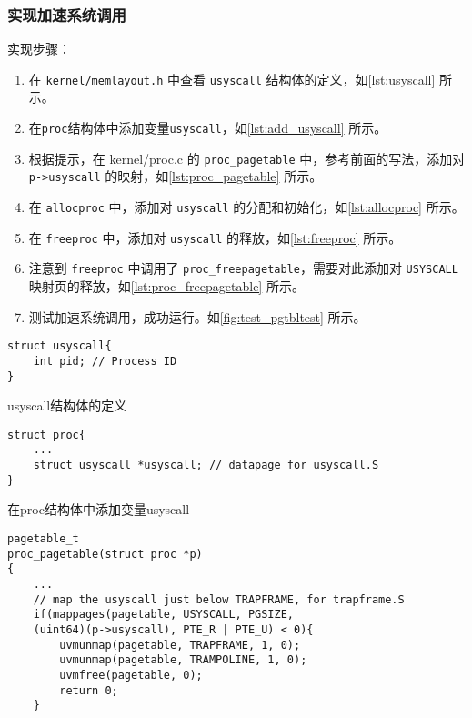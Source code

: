 {\subsubsection{实现加速系统调用}

实现步骤：
\begin{enumerate}
	\item 在 \texttt{kernel/memlayout.h} 中查看 \texttt{usyscall} 结构体的定义，如\cref{lst:usyscall} 所示。
	\item 在\texttt{proc}结构体中添加变量\texttt{usyscall}，如\cref{lst:add_usyscall} 所示。
	\item 根据提示，在 kernel/proc.c 的 \texttt{proc\_pagetable} 中，参考前面的写法，添加对\texttt{p->usyscall} 的映射，如\cref{lst:proc_pagetable} 所示。
	\item 在 \texttt{allocproc} 中，添加对 \texttt{usyscall} 的分配和初始化，如\cref{lst:allocproc} 所示。
	\item 在 \texttt{freeproc} 中，添加对 \texttt{usyscall} 的释放，如\cref{lst:freeproc} 所示。
	\item 注意到 \texttt{freeproc} 中调用了 \texttt{proc\_freepagetable}，需要对此添加对 \texttt{USYSCALL} 映射页的释放，如\cref{lst:proc_freepagetable} 所示。
	\item 测试加速系统调用，成功运行。如\cref{fig:test_pgtbltest} 所示。
\end{enumerate}

\begin{listing}[!htb]
	\begin{verbatim}
struct usyscall{
    int pid; // Process ID
}
	\end{verbatim}
	\caption{usyscall结构体的定义}\label{lst:usyscall}
\end{listing}

\begin{listing}[!htb]
	\begin{verbatim}
struct proc{
    ...
    struct usyscall *usyscall; // datapage for usyscall.S
}
	\end{verbatim}
	\caption{在proc结构体中添加变量usyscall}\label{lst:add_usyscall}
\end{listing}                                    

\begin{listing}[!htb]
	\begin{verbatim}
pagetable_t
proc_pagetable(struct proc *p)
{
    ...
    // map the usyscall just below TRAPFRAME, for trapframe.S
    if(mappages(pagetable, USYSCALL, PGSIZE,
    (uint64)(p->usyscall), PTE_R | PTE_U) < 0){
        uvmunmap(pagetable, TRAPFRAME, 1, 0);
        uvmunmap(pagetable, TRAMPOLINE, 1, 0);
        uvmfree(pagetable, 0);
        return 0;
    }


\end{verbatim}
\end{listing}}
